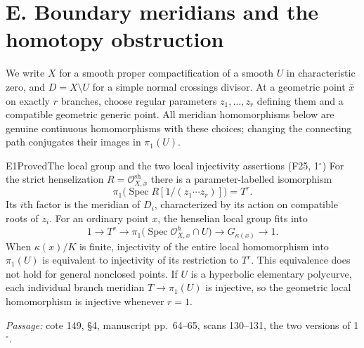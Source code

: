 \section{E. Boundary meridians and the homotopy obstruction}
\label{sec:DE-boundary}
We write $X$ for a smooth proper compactification of a smooth $U$ in characteristic zero, and $D=X\setminus U$ for a simple normal crossings divisor. At a geometric point $\bar x$ on exactly $r$ branches, choose regular parameters $z_1,\ldots,z_r$ defining them and a compatible geometric generic point. All meridian homomorphisms below are genuine continuous homomorphisms with these choices; changing the connecting path conjugates their images in $\pi_1(U)$.

\begin{result}{E1}{Proved}{The local group and the two local injectivity assertions (F25, 1$^\circ$)}
For the strict henselization $R=\mathcal O_{X,\bar x}^{\mathrm{sh}}$ there is a parameter-labelled isomorphism
\[
 \pi_1\bigl(\operatorname{Spec}R[1/(z_1\cdots z_r)]\bigr)=T^r.
\]
Its $i$th factor is the meridian of $D_i$, characterized by its action on compatible roots of $z_i$. For an ordinary point $x$, the henselian local group fits into
\[
 1\longrightarrow T^r\longrightarrow
 \pi_1\bigl(\operatorname{Spec}\mathcal O_{X,x}^{h}\cap U\bigr)
 \longrightarrow G_{\kappa(x)}\longrightarrow1.
\]
When $\kappa(x)/K$ is finite, injectivity of the entire local homomorphism into $\pi_1(U)$ is equivalent to injectivity of its restriction to $T^r$. This equivalence does not hold for general nonclosed points. If $U$ is a hyperbolic elementary polycurve, each individual branch meridian $T\to\pi_1(U)$ is injective, so the geometric local homomorphism is injective whenever $r=1$.
\par\emph{Passage:} cote 149, \S4, manuscript pp.~64--65, scans 130--131, the two versions of 1$^\circ$.
\end{result}
